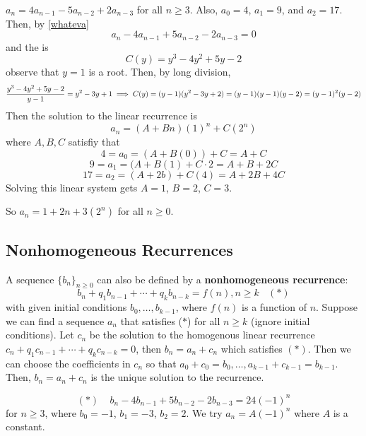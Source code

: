 \documentclass[english, 11pt]{article}
\begin{document}
\begin{exmp}
  $a_n = 4a_{n-1} - 5a_{n-2} + 2a_{n-3}$ for all $n \geq 3$. Also, $a_0 = 4$, $a_1 = 9$, and $a_2 = 17$. Then, by \autoref{whateva}
  \[ a_n - 4a_{n-1} + 5a_{n-2} - 2a_{n-3} = 0 \]
  and the  is
  \[ C(y) = y^3 - 4y^2 + 5y - 2 \]
  observe that $y = 1$ is a root. Then, by long division,
  \[ \frac{y^3 - 4y^2 + 5y - 2}{y-1} = y^2 - 3y + 1 \implies C(y) = (y-1)(y^2 - 3y + 2) = (y-1)(y-1)(y-2) = (y-1)^2(y-2)\]
  Then the solution to the linear recurrence is
  \[ a_n = (A + Bn)(1)^n + C(2^n) \]
  where $A, B, C$ satisfiy that
  \[ 4 = a_0 = (A+B(0)) + C = A + C \]
  \[ 9 = a_1 = (A + B(1) + C\cdot 2 = A + B + 2C \]
  \[ 17 = a_2 = (A + 2b) + C(4) = A + 2B + 4C \]
  Solving this linear system gets $A = 1$, $B = 2$, $C = 3$.
\end{exmp}

So $a_n = 1 + 2n + 3(2^n)$ for all $n \geq 0$.

\subsection{Nonhomogeneous Recurrences}

A sequence $\{b_n\}_{n \geq 0}$ can also be defined by a \textbf{nonhomogeneous recurrence}:
\[ b_n + q_1b_{n-1} + \cdots + q_kb_{n-k} = f(n), n \geq k \ \ \ \ (*) \]
with given initial conditions $b_0, \ldots, b_{k-1}$, where $f(n)$ is a function of $n$. Suppose we can find a sequence $a_n$ that satisfies ($*$) for all $n \geq k$ (ignore initial conditions). Let $c_n$ be the solution to the homogenous linear recurrence $c_n + q_1c_{n-1} + \cdots + q_kc_{n-k} = 0$, then $b_n = a_n + c_n$ which satisfies $(*)$. Then we can choose the coefficients in $c_n$ so that $a_0 + c_0 = b_0, \ldots, a_{k-1} + c_{k-1} = b_{k-1}$. Then, $b_n = a_n + c_n$ is the unique solution to the recurrence.

\begin{exmp}
  \[ (*) \ \ \ \ \ b_n - 4b_{n-1} + 5b_{n-2} - 2b_{n-3} = 24(-1)^n \]
  for $n \geq 3$, where $b_0 = -1$, $b_1 = -3$, $b_2 = 2$. We try $a_n = A(-1)^n$ where $A$ is a constant.
\end{exmp}
\end{document}
